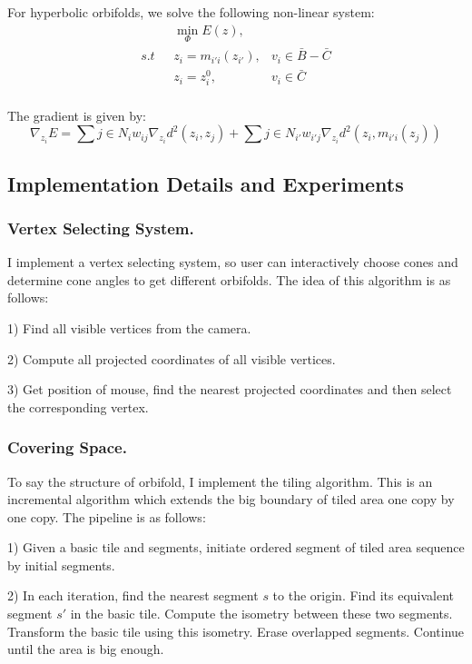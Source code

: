 For hyperbolic orbifolds, we solve the following non-linear system:
\begin{equation}
\begin{split}
&\min_{\Phi} E(z),&\\
s.t \ \ \ &z_i = m_{i'i}(z_{i'}), &v_i \in \bar{B} - \bar{C}\\
 &z_i = z_i^0, &v_i \in \bar{C}\\
\end{split}
\end{equation}

The gradient is given by:
\begin{equation}
\nabla_{z_i} E = \sum{j\in N_i}  w_{ij}\nabla_{z_i}d^2(z_i, z_j) + \sum{j\in N_{i'}}w_{i'j}\nabla_{z_i}d^2(z_i, m_{i'i}(z_j))
\end{equation}

\subsection{Implementation Details and Experiments}
\subsubsection{Vertex Selecting System.} 
I implement a vertex selecting system, so user can interactively choose cones and determine cone angles to get different orbifolds. The idea of this algorithm is as follows:

1) Find all visible vertices from the camera.

2) Compute all projected coordinates of all visible vertices.

3) Get position of mouse, find the nearest projected coordinates and then select the corresponding vertex.

\subsubsection{Covering Space.} 
To say the structure of orbifold, I implement the tiling algorithm. This is an incremental algorithm which extends the big boundary of tiled area one copy by one copy. The pipeline is as follows:

1) Given a basic tile and segments, initiate ordered segment of tiled area sequence by initial segments.

2) In each iteration, find the nearest segment $s$ to the origin. Find its equivalent segment $s'$ in the basic tile. Compute the isometry between these two segments. Transform the basic tile using this isometry. Erase overlapped segments. Continue until the area is big enough.

